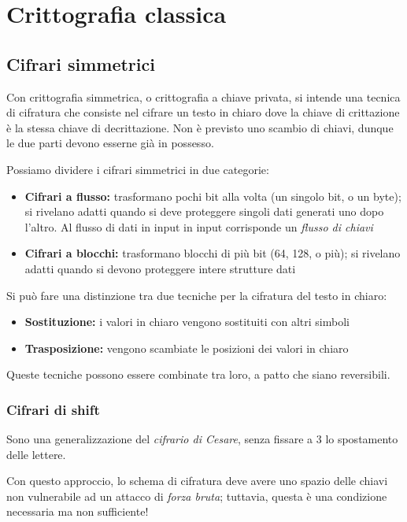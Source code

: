 \chapter{Crittografia classica}

\section{Cifrari simmetrici}
Con crittografia simmetrica, o crittografia a chiave privata, si intende una tecnica di cifratura che consiste nel cifrare
un testo in chiaro dove la chiave di crittazione è la stessa chiave di decrittazione. Non è previsto uno scambio di chiavi, 
dunque le due parti devono esserne già in
possesso.

\noindent Possiamo dividere i cifrari simmetrici in due categorie:
\begin{itemize}
    \item \textbf{Cifrari a flusso:} trasformano pochi bit alla volta (un singolo bit, o un byte); si rivelano adatti quando si deve 
    proteggere singoli dati generati uno dopo l'altro. Al flusso di dati in input in input corrisponde un \textit{flusso di chiavi}
    \item \textbf{Cifrari a blocchi:} trasformano blocchi di più bit (64, 128, o più); si rivelano adatti quando si devono 
    proteggere intere strutture dati 
\end{itemize}

\noindent Si può fare una distinzione tra due tecniche per la cifratura del testo in chiaro:
\begin{itemize}
    \item \textbf{Sostituzione:} i valori in chiaro vengono sostituiti con altri simboli
    \item \textbf{Trasposizione:} vengono scambiate le posizioni dei valori in chiaro 
\end{itemize}

\noindent Queste tecniche possono essere combinate tra loro, a patto che siano reversibili.

\subsection{Cifrari di shift}

Sono una generalizzazione del \textit{cifrario di Cesare}, senza fissare a 3 lo spostamento delle lettere.

\noindent Con questo approccio, lo schema di cifratura deve avere uno spazio delle chiavi non vulnerabile ad un attacco 
di \textit{forza bruta}; tuttavia, questa è una condizione necessaria ma non sufficiente!

